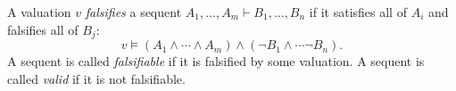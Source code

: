 

\setcounter{section}{2}
\setcounter{subsection}{4}
\setcounter{dfn}{8}

\begin{dfn}
\label{dfn:FalsifySequent}
A valuation $v$ \emph{falsifies} a sequent $A_1, \ldots, A_m \vdash B_1, \ldots, B_n$ if it satisfies all of $A_i$ and falsifies all of $B_j$:
\[
v \vDash (A_1 \wedge \cdots \wedge A_m) \wedge (\neg B_1 \wedge \cdots \neg B_n).
\]
A sequent is called \emph{falsifiable} if it is falsified by some valuation.
A sequent is called \emph{valid} if it is not falsifiable.
\end{dfn}

